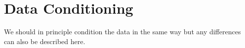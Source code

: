 \section{Data Conditioning}
\label{sec:conditioning}
We should in principle condition the data in the same way but any differences
can also be described here.